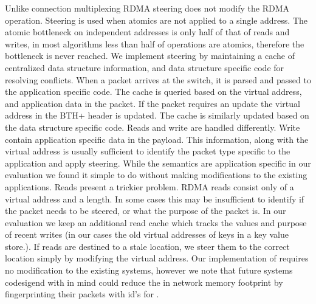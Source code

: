 Unlike connection multiplexing RDMA steering does not modify
the RDMA operation. Steering is used when atomics are not
applied to a single address. The atomic bottleneck on
independent addresses is only half of that of reads and
writes, in most algorithms less than half of operations are
atomics, therefore the bottleneck is never reached. 
We implement steering by maintaining a cache of centralized
data structure information, and data structure specific code
for resolving conflicts. When a packet arrives at the
switch, it is parsed and passed to the application specific
code. The cache is queried based on the virtual address, and
application data in the packet. If the packet requires an
update the virtual address in the BTH+ header is updated.
The cache is similarly updated based on the data structure
specific code.
Reads and write are handled differently. Write contain
application specific data in the payload. This information,
along with the virtual address is usually sufficient to
identify the packet type specific to the application and
apply steering. While the semantics are application specific
in our evaluation we found it simple to do without making
modifications to the existing applications.
Reads present a trickier problem. RDMA reads consist only of
a virtual address and a length. In some cases this may be
insufficient to identify if the packet needs to be steered,
or what the purpose of the packet is. In our evaluation we
keep an additional read cache which tracks the values and
purpose of recent writes (in our cases the old virtual
addresses of keys in a key value store.). If reads are
destined to a stale location, we steer them to the correct
location simply by modifying the virtual address.
Our implementation of \sword requires no modification to the
existing systems, however we note that future systems
codesigend with \sword in mind could reduce the in network
memory footprint by fingerprinting their packets with id's
for {\sword}.





